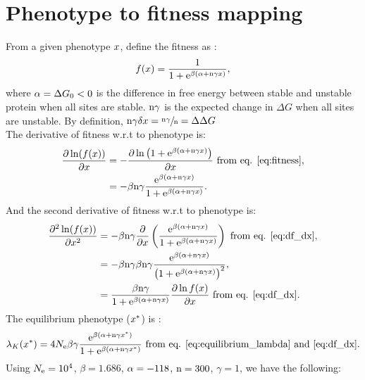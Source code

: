 \documentclass{article}
\begin{document}
\section*{Phenotype to fitness mapping}
From a given phenotype $x$, define the fitness as :
\begin{gather}
 f(x) = \frac{1}{1 + \mathrm{e}^{\beta(\alpha + \text{n} \gamma x)}}, \label{eq:fitness}
\end{gather}
where $\alpha = \Delta G_0 < 0$ is the difference in free energy between stable and unstable protein when all sites are stable. $\text{n} \gamma$ is the expected change in $\Delta G$ when all sites are unstable. By definition, $\text{n} \gamma \delta x = \sfrac{\text{n} \gamma}{\text{n}} = \Delta \Delta G $\\
The derivative of fitness w.r.t to phenotype is:
\begin{align}
 \frac{\partial \ln (f(x))}{\partial x}  & = - \frac{\partial \ln \left( 1 + \mathrm{e}^{\beta(\alpha + \text{n} \gamma x)} \right)}{\partial x} \text{ from eq. \ref{eq:fitness}}, \\
 & = - \beta \text{n} \gamma \frac{\mathrm{e}^{\beta(\alpha + \text{n} \gamma x)}}{1 + \mathrm{e}^{\beta(\alpha + \text{n} \gamma x)}} \label{eq:df_dx}.
\end{align}
And the second derivative of fitness w.r.t to phenotype is:
\begin{align}
\frac{\partial^2 \ln (f(x))}{\partial {x}^2} & = - \beta \text{n} \gamma \frac{\partial}{\partial x} \left( \frac{\mathrm{e}^{\beta(\alpha + \text{n} \gamma x)}}{1 + \mathrm{e}^{\beta(\alpha + \text{n} \gamma x)}} \right) \text{ from eq. \ref{eq:df_dx}}, \\
 & = - \beta \text{n} \gamma  \beta \text{n} \gamma \frac{\mathrm{e}^{\beta(\alpha + \text{n} \gamma x)}}{\left( 1 + \mathrm{e}^{\beta(\alpha + \text{n} \gamma x)}\right)^2}, \\
 & = \frac{\beta \text{n} \gamma}{1 + \mathrm{e}^{\beta(\alpha + \text{n} \gamma x)}} \frac{ \partial \ln f(x) }{\partial {x}} \text{ from eq. \ref{eq:df_dx}} \label{eq:df2_dx2}.
\end{align}
The equilibrium phenotype ($x^{*}$) is :
\begin{gather}
\lambda_{K}(x^{*}) = 4N_{\mathrm{e}} \beta \gamma \frac{\mathrm{e}^{\beta(\alpha + \text{n} \gamma x^{*})}}{1 + \mathrm{e}^{\beta(\alpha + \text{n} \gamma x^{*})}}  \text{ from eq. \ref{eq:equilibrium_lambda} and \ref{eq:df_dx}}.
\end{gather}
Using $N_{\mathrm{e}}=10^4$, $\beta=1.686$, $\alpha = -118$, $\text{n}=300$, $\gamma=1$, we have the following:
\end{document}
